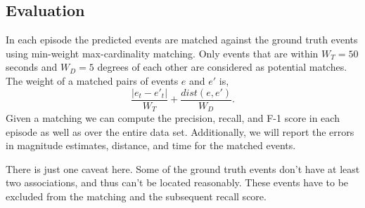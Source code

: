 \documentclass[12pt,letterpaper,onecolumn,oneside]{article}
\begin{document}
\subsection{Evaluation}

In each episode the predicted events are matched against the ground
truth events using min-weight max-cardinality matching. Only events that
are within $W_T=50$ seconds and $W_D=5$ degrees of each other are
considered as potential matches. The weight of a matched pairs of events
$e$ and $e'$ is,
\[\frac{|e_t - e'_t|}{W_T}  + \frac{dist(e,e')}{W_D} . \]
Given a matching we can compute the precision, recall, and F-1 score in
each episode as well as over the entire data set. Additionally, we will
report the errors in magnitude estimates, distance, and time for the
matched events.

There is just one caveat here. Some of the ground truth events don't
have at least two associations, and thus can't be located
reasonably. These events have to be excluded from the matching and the
subsequent recall score.
\end{document}
